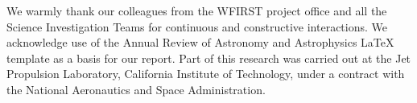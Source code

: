 
We warmly thank our colleagues from the WFIRST project office and all the Science Investigation Teams for continuous and constructive interactions. We acknowledge use of the Annual Review of Astronomy and Astrophysics LaTeX template as a basis for our report. Part of this research was carried out at the Jet Propulsion Laboratory, California Institute of Technology, under a contract with the National Aeronautics and Space Administration.
